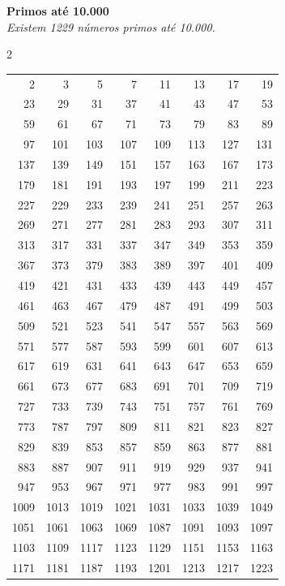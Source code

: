 \documentclass{article}
\begin{document}
\noindent
\textbf{Primos até 10.000} \\
\textit{Existem 1229 números primos até 10.000.}

\begin{multicols}{2}
\noindent
\begin{tabular}{r r r r r r r r}
2 & 3 & 5 & 7 & 11 & 13 & 17 & 19\\
23 & 29 & 31 & 37 & 41 & 43 & 47 & 53\\
59 & 61 & 67 & 71 & 73 & 79 & 83 & 89\\
97 & 101 & 103 & 107 & 109 & 113 & 127 & 131\\
137 & 139 & 149 & 151 & 157 & 163 & 167 & 173\\
179 & 181 & 191 & 193 & 197 & 199 & 211 & 223\\
227 & 229 & 233 & 239 & 241 & 251 & 257 & 263\\
269 & 271 & 277 & 281 & 283 & 293 & 307 & 311\\
313 & 317 & 331 & 337 & 347 & 349 & 353 & 359\\
367 & 373 & 379 & 383 & 389 & 397 & 401 & 409\\
419 & 421 & 431 & 433 & 439 & 443 & 449 & 457\\
461 & 463 & 467 & 479 & 487 & 491 & 499 & 503\\
509 & 521 & 523 & 541 & 547 & 557 & 563 & 569\\
571 & 577 & 587 & 593 & 599 & 601 & 607 & 613\\
617 & 619 & 631 & 641 & 643 & 647 & 653 & 659\\
661 & 673 & 677 & 683 & 691 & 701 & 709 & 719\\
727 & 733 & 739 & 743 & 751 & 757 & 761 & 769\\
773 & 787 & 797 & 809 & 811 & 821 & 823 & 827\\
829 & 839 & 853 & 857 & 859 & 863 & 877 & 881\\
883 & 887 & 907 & 911 & 919 & 929 & 937 & 941\\
947 & 953 & 967 & 971 & 977 & 983 & 991 & 997\\
1009 & 1013 & 1019 & 1021 & 1031 & 1033 & 1039 & 1049\\
1051 & 1061 & 1063 & 1069 & 1087 & 1091 & 1093 & 1097\\
1103 & 1109 & 1117 & 1123 & 1129 & 1151 & 1153 & 1163\\
1171 & 1181 & 1187 & 1193 & 1201 & 1213 & 1217 & 1223\\
\end{tabular}


\end{multicols}
\end{document}

